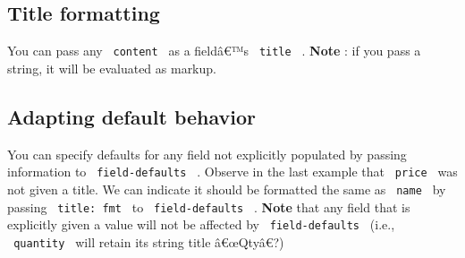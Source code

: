
\subsection{Title formatting}\label{title-formatting}

You can pass any \texttt{\ content\ } as a fieldâ€™s \texttt{\ title\ }
. \textbf{Note} : if you pass a string, it will be evaluated as markup.

\begin{Shaded}
\begin{Highlighting}[]
\NormalTok{  )}
\NormalTok{\}}

\NormalTok{)}

\end{Highlighting}
\end{Shaded}


\subsection{Adapting default behavior}\label{adapting-default-behavior}

You can specify defaults for any field not explicitly populated by
passing information to \texttt{\ field-defaults\ } . Observe in the last
example that \texttt{\ price\ } was not given a title. We can indicate
it should be formatted the same as \texttt{\ name\ } by passing
\texttt{\ title:\ fmt\ } to \texttt{\ field-defaults\ } . \textbf{Note}
that any field that is explicitly given a value will not be affected by
\texttt{\ field-defaults\ } (i.e., \texttt{\ quantity\ } will retain its
string title â€œQtyâ€?)

\begin{Shaded}
\begin{Highlighting}[]
\end{Highlighting}
\end{Shaded}

